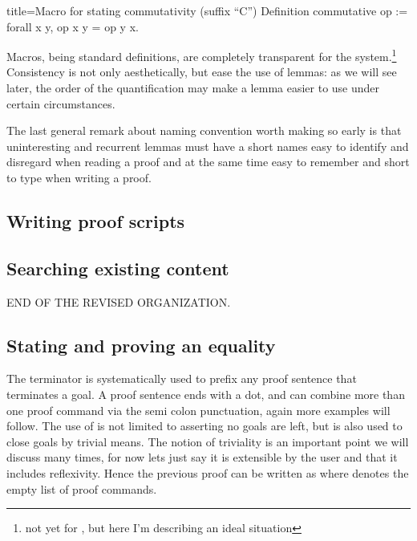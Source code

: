 \begin{coq}{title=Macro for stating commutativity (suffix ``C'')}
Definition commutative op := forall x y, op x y = op y x.
\end{coq}

Macros, being standard definitions, are completely transparent for the
system.\footnote{not yet for , but here I'm describing an ideal
situation}  Consistency is not only aesthetically, but ease the use of
lemmas: as we will see later, the order of the quantification may make
a lemma easier to use under certain circumstances.

The last general remark about naming convention worth making so early is that
uninteresting and recurrent lemmas must have a short names easy to identify and
disregard when reading a proof and at the same time easy to remember and short
to type when writing a proof.


\subsection{Writing proof scripts}


\subsection{Searching existing content}

END OF THE REVISED ORGANIZATION.

\subsection{Stating and proving an equality}

The  terminator is systematically used to prefix any proof sentence
that terminates a goal.  A proof sentence ends with a dot, and can
combine more than one proof command via the semi colon punctuation,
again more examples will follow.
The use of  is not limited to asserting no goals are left,
but is also used to close goals by trivial means.  The notion of triviality
is an important point we will discuss many times, for now lets just
say it is extensible by the user and that it includes reflexivity.
Hence the previous proof can be written as  where \C{[]}
denotes the empty list of proof commands.

